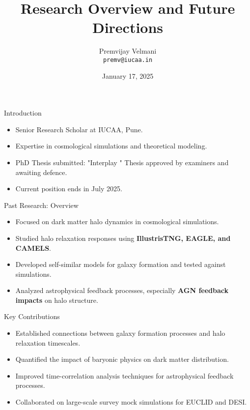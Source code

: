 \documentclass{beamer}
\title[Research Overview]{Research Overview and Future Directions}
\author[PremVijay Velmani]{Premvijay Velmani \\\texttt{premv@iucaa.in}}
\institute[IUCAA]{Inter-University Centre for Astronomy and Astrophysics (IUCAA)}
\date[KIAS Interview]{January 17, 2025}
\begin{document}
\begin{frame}
    \titlepage
\end{frame}

\begin{frame}{Introduction}
    \begin{itemize}
        \item Senior Research Scholar at IUCAA, Pune.
        \item Expertise in cosmological simulations and theoretical modeling.
        \item PhD Thesis submitted: "Interplay " Thesis approved by examiners and awaiting defence.
        \item Current position ends in July 2025.
    \end{itemize}
\end{frame}

\begin{frame}{Past Research: Overview}
    \begin{itemize}
        \item Focused on dark matter halo dynamics in cosmological simulations.
        \item Studied halo relaxation responses using \textbf{IllustrisTNG, EAGLE, and CAMELS}.
        \item Developed self-similar models for galaxy formation and tested against simulations.
        \item Analyzed astrophysical feedback processes, especially \textbf{AGN feedback impacts} on halo structure.
    \end{itemize}
\end{frame}

\begin{frame}{Key Contributions}
    \begin{itemize}
        \item Established connections between galaxy formation processes and halo relaxation timescales.
        \item Quantified the impact of baryonic physics on dark matter distribution.
        \item Improved time-correlation analysis techniques for astrophysical feedback processes.
        \item Collaborated on large-scale survey mock simulations for EUCLID and DESI.
    \end{itemize}
\end{frame}
\end{document}
